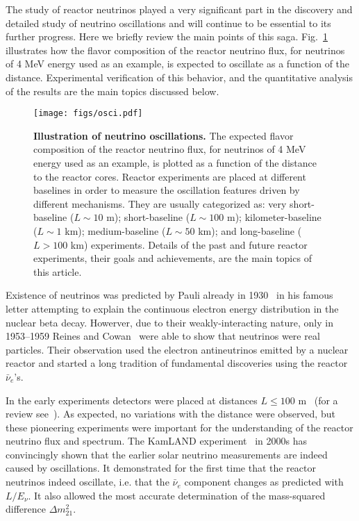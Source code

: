 The study of reactor neutrinos played a very significant part in the discovery and detailed study of neutrino oscillations and will continue 
to be essential to its further progress. Here we briefly review
the main points of this saga. Fig.~\ref{fig:intro1} illustrates how the flavor composition of the reactor neutrino flux, for neutrinos of 4 MeV energy
used as an example, is expected to oscillate as a function of the distance. Experimental verification of this behavior, and the quantitative analysis of the
results are the main topics discussed below.

\begin{figure}[tb]
\begin{centering}
\texttt{[image: figs/osci.pdf]}
\par\end{centering}
\caption{\label{fig:intro1} {\bf Illustration of neutrino oscillations.} The expected flavor composition of the reactor neutrino flux, for neutrinos of 4 MeV energy
used as an example,  is plotted as a function of the distance to the reactor cores. Reactor experiments are placed at different baselines in order to measure the oscillation features driven by different mechanisms. They are usually categorized as: very short-baseline ($L\sim10$ m); short-baseline ($L\sim100$ m); kilometer-baseline ($L\sim1$ km); medium-baseline ($L\sim50$ km); and long-baseline ($L>100$ km) experiments. Details of the past and future reactor experiments, their goals and achievements, are the main topics of this article.
}
\end{figure}

Existence of neutrinos was predicted by Pauli already in 1930~\cite{Pauli30} in his famous letter attempting to explain the continuous electron energy distribution in the nuclear beta decay. 
Howerver, due to their weakly-interacting nature, only in 1953--1959 Reines and Cowan~\cite{Reines53,Cowan56,Reines59} were able to show that neutrinos were real particles. 
Their observation used the electron antineutrinos emitted by a nuclear reactor and started a long tradition of fundamental discoveries using the reactor $\bar{\nu}_e$'s.

In the early experiments detectors were placed at distances $L \le 100$ m~\cite{ILL,Gosgen,Rovno,Krasnoyarsk,SRP,Bugey4,Bugey3} (for a review see~\cite{Bemporad02}). As expected, no variations
with the distance were observed, but these pioneering experiments were important for the understanding of the reactor neutrino flux and spectrum.
The KamLAND experiment~\cite{Kamland03,Kamland05,Kamland08} in 2000s has convincingly shown that the earlier solar neutrino measurements are indeed caused by oscillations. 
It demonstrated for the first time that the reactor neutrinos indeed oscillate, i.e. that the $\bar{\nu}_e$ component changes as predicted with $L/E_{\nu}$. 
It also allowed the most accurate determination of the mass-squared difference $\Delta m^2_{21}$.  

